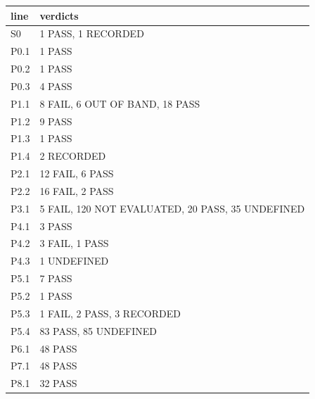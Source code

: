 \begin{tabular}{ll}
\toprule
line & verdicts \\
\midrule
S0 & 1 PASS, 1 RECORDED \\
P0.1 & 1 PASS \\
P0.2 & 1 PASS \\
P0.3 & 4 PASS \\
P1.1 & 8 FAIL, 6 OUT OF BAND, 18 PASS \\
P1.2 & 9 PASS \\
P1.3 & 1 PASS \\
P1.4 & 2 RECORDED \\
P2.1 & 12 FAIL, 6 PASS \\
P2.2 & 16 FAIL, 2 PASS \\
P3.1 & 5 FAIL, 120 NOT EVALUATED, 20 PASS, 35 UNDEFINED \\
P4.1 & 3 PASS \\
P4.2 & 3 FAIL, 1 PASS \\
P4.3 & 1 UNDEFINED \\
P5.1 & 7 PASS \\
P5.2 & 1 PASS \\
P5.3 & 1 FAIL, 2 PASS, 3 RECORDED \\
P5.4 & 83 PASS, 85 UNDEFINED \\
P6.1 & 48 PASS \\
P7.1 & 48 PASS \\
P8.1 & 32 PASS \\
\bottomrule
\end{tabular}

